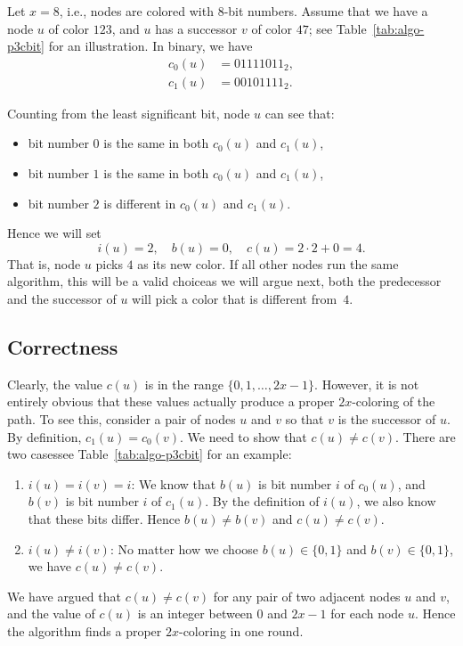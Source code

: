 Let $x = 8$, i.e., nodes are colored with $8$-bit numbers. Assume that we have a node $u$ of color $123$, and $u$ has a successor $v$ of color $47$; see Table~\ref{tab:algo-p3cbit} for an illustration. In binary, we have
\begin{align*}
    c_0(u) &= 01111011_2, \\
    c_1(u) &= 00101111_2.
\end{align*}
\begin{samepage}
Counting from the least significant bit, node $u$ can see that:
\begin{itemize}[noitemsep]
    \item bit number $0$ is the same in both $c_0(u)$ and $c_1(u)$,
    \item bit number $1$ is the same in both $c_0(u)$ and $c_1(u)$,
    \item bit number $2$ is different in $c_0(u)$ and $c_1(u)$.
\end{itemize}
\end{samepage}
Hence we will set
\[
    i(u) = 2, \quad
    b(u) = 0, \quad
    c(u) = 2\cdot2 + 0 = 4.
\]
That is, node $u$ picks $4$ as its new color. If all other nodes run the same algorithm, this will be a valid choice\mydash as we will argue next, both the predecessor and the successor of $u$ will pick a color that is different from~$4$.


\subsection{Correctness}

Clearly, the value $c(u)$ is in the range $\{0,1,\dotsc,2x-1\}$. However, it is not entirely obvious that these values actually produce a proper $2x$-coloring of the path. To see this, consider a pair of nodes $u$ and $v$ so that $v$ is the successor of $u$. By definition, $c_1(u) = c_0(v)$. We need to show that $c(u) \ne c(v)$. There are two cases\mydash see Table~\ref{tab:algo-p3cbit} for an example:
\begin{enumerate}
    \item $i(u) = i(v) = i$: We know that $b(u)$ is bit number $i$ of $c_0(u)$, and $b(v)$ is bit number $i$ of $c_1(u)$. By the definition of $i(u)$, we also know that these bits differ. Hence $b(u) \ne b(v)$ and $c(u) \ne c(v)$.
    \item $i(u) \ne i(v)$: No matter how we choose $b(u) \in \{0,1\}$ and $b(v) \in \{0,1\}$, we have $c(u) \ne c(v)$.
\end{enumerate}
We have argued that $c(u) \ne c(v)$ for any pair of two adjacent nodes $u$ and $v$, and the value of $c(u)$ is an integer between $0$ and $2x-1$ for each node $u$. Hence the algorithm finds a proper $2x$-coloring in one round.


